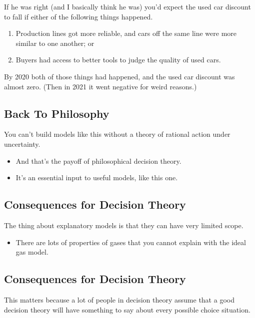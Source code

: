 \documentclass[
  11pt,
  letterpaper,
  DIV=11,
  numbers=noendperiod,
  oneside]{scrartcl}
\providecommand{\tightlist}{%
  \setlength{\itemsep}{0pt}\setlength{\parskip}{0pt}}\usepackage{longtable,booktabs,array}
\begin{document}
If he was right (and I basically think he was) you'd expect the used car
discount to fall if either of the following things happened.

\begin{enumerate}
\def\labelenumi{\arabic{enumi}.}
\tightlist
\item
  Production lines got more reliable, and cars off the same line were
  more similar to one another; or
\item
  Buyers had access to better tools to judge the quality of used cars.
\end{enumerate}

By 2020 both of those things had happened, and the used car discount was
almost zero. (Then in 2021 it went negative for weird reasons.)

\subsection{Back To Philosophy}\label{back-to-philosophy}

You can't build models like this without a theory of rational action
under uncertainty.

\begin{itemize}
\tightlist
\item
  And that's the payoff of philosophical decision theory.
\item
  It's an essential input to useful models, like this one.
\end{itemize}

\subsection{Consequences for Decision
Theory}\label{consequences-for-decision-theory}

The thing about explanatory models is that they can have very limited
scope.

\begin{itemize}
\tightlist
\item
  There are lots of properties of gases that you cannot explain with the
  ideal gas model.
\end{itemize}

\subsection{Consequences for Decision
Theory}\label{consequences-for-decision-theory-1}

This matters because a lot of people in decision theory assume that a
good decision theory will have something to say about every possible
choice situation.
\end{document}
